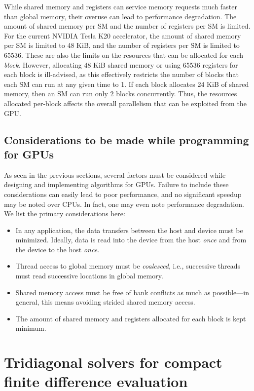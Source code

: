 While shared memory and registers can service memory requests
much faster than global memory,
their overuse can lead to performance degradation.
The amount of shared memory per SM
and the number of registers per SM is limited.
For the current NVIDIA Tesla K20 accelerator,
the amount of shared memory per SM is limited to 48 KiB,
and the number of registers per SM is limited to 65536.
These are also the limits
on the resources that can be allocated for each \emph{block}.
However,
allocating 48 KiB shared memory or using 65536 registers 
for each block is ill-advised,
as this effectively restricts the number of blocks that
each SM can run at any given time to 1.
If each block allocates 24 KiB of shared memory,
then an SM can run only 2 blocks concurrently.
Thus, the resources allocated per-block affects
the overall parallelism that can be exploited from the GPU.

\subsection{Considerations to be made while programming for GPUs}

As seen in the previous sections,
several factors must be considered while
designing and implementing algorithms for GPUs.
Failure to include these considerations can easily
lead to poor performance,
and no significant speedup may be noted over CPUs.
In fact, one may even note performance degradation.
We list the primary considerations here:

\begin{itemize}
    \item In any application, the data transfers between
        the host and device must be minimized.
        Ideally,
        data is read into the device from the host \emph{once}
        and from the device to the host \emph{once}.
    \item Thread access to global memory must be \emph{coalesced},
        i.e., successive threads must read successive locations
        in global memory.
    \item Shared memory access must be free of bank conflicts
        as much as possible---in general, this means avoiding
        strided shared memory access.
    \item The amount of shared memory and registers
        allocated for each block is kept minimum.
\end{itemize}

\section{Tridiagonal solvers for compact finite difference evaluation}

